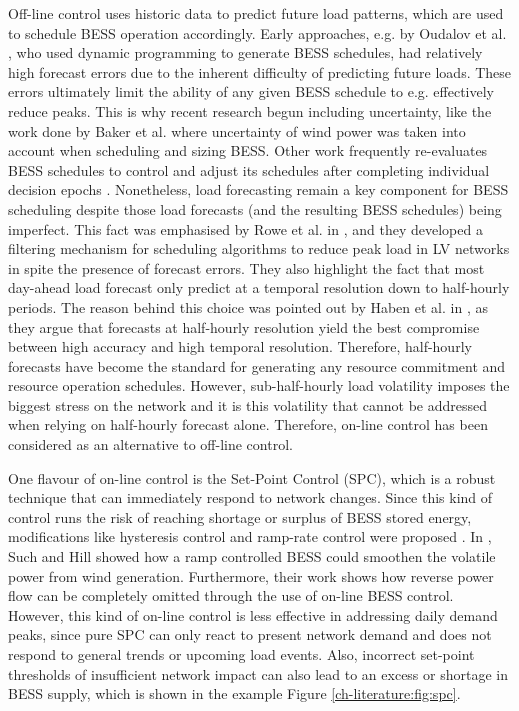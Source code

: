Off-line control uses historic data to predict future load patterns, which are used to schedule BESS operation accordingly.
Early approaches, e.g. by Oudalov et al. \cite{Oudalov2007}, who used dynamic programming to generate BESS schedules, had relatively high forecast errors due to the inherent difficulty of predicting future loads.
These errors ultimately limit the ability of any given BESS schedule to e.g. effectively reduce peaks.
This is why recent research begun including uncertainty, like the work done by Baker et al. \cite{Baker2017} where uncertainty of wind power was taken into account when scheduling and sizing BESS.
Other work frequently re-evaluates BESS schedules to control and adjust its schedules after completing individual decision epochs \cite{Wang2014a}.
Nonetheless, load forecasting remain a key component for BESS scheduling despite those load forecasts (and the resulting BESS schedules) being imperfect.
This fact was emphasised by Rowe et al. in \cite{Rowe2014a}, and they developed a filtering mechanism for scheduling algorithms to reduce peak load in LV networks in spite the presence of forecast errors.
They also highlight the fact that most day-ahead load forecast only predict at a temporal resolution down to half-hourly periods.
The reason behind this choice was pointed out by Haben et al. in \cite{Poghosyan2014, Haben2014}, as they argue that forecasts at half-hourly resolution yield the best compromise between high accuracy and high temporal resolution.
Therefore, half-hourly forecasts have become the standard for generating any resource commitment and resource operation schedules.
However, sub-half-hourly load volatility imposes the biggest stress on the network and it is this volatility that cannot be addressed when relying on half-hourly forecast alone.
Therefore, on-line control has been considered as an alternative to off-line control.

One flavour of on-line control is the Set-Point Control (SPC), which is a robust technique that can immediately respond to network changes.
Since this kind of control runs the risk of reaching shortage or surplus of BESS stored energy, modifications like hysteresis control and ramp-rate control were proposed \cite{Gybel2012, Blaabjerg2006, Malesani1990, Xu2011a, Such2012}.
In \cite{Such2012}, Such and Hill showed how a ramp controlled BESS could smoothen the volatile power from wind generation.
Furthermore, their work shows how reverse power flow can be completely omitted through the use of on-line BESS control.
However, this kind of on-line control is less effective in addressing daily demand peaks, since pure SPC can only react to present network demand and does not respond to general trends or upcoming load events.
Also, incorrect set-point thresholds of insufficient network impact can also lead to an excess or shortage in BESS supply, which is shown in the example Figure \ref{ch-literature:fig:spc}.

